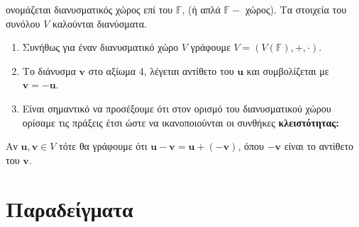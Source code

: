 \documentclass[a4paper,table]{report}
\begin{document}
\begin{dfn}
\vspace{\baselineskip}

ονομάζεται \textcolor{Col1}{διανυσματικός χώρος} επί του $\mathbb{F}$, 
(ή απλά $ \mathbb{F}-$ χώρος).  Τα 
στοιχεία του συνόλου $V$ καλούνται \textcolor{Col1}{διανύσματα}.
\end{dfn}

\begin{rem}
\item {}
  \begin{enumerate}
    \item Συνήθως για έναν διανυσματικό χώρο $V$ γράφουμε 
      $V = (V(\mathbb{F}), +, \cdot) $.
    \item Το διάνυσμα $ \mathbf{v} $ στο αξίωμα 4, λέγεται 
      \textcolor{Col1}{αντίθετο} του $ \mathbf{u} $ και συμβολίζεται με 
      $ \mathbf{v} = - \mathbf{u} $.
    \item Είναι σημαντικό να προσέξουμε ότι στον ορισμό του διανυσματικού χώρου 
      ορίσαμε τις πράξεις έτσι ώστε να ικανοποιούνται οι συνθήκες \textbf{κλειστότητας:}
  \end{enumerate}
\end{rem}

\begin{rem}
  Αν $ \mathbf{u}, \mathbf{v} \in V $ τότε θα γράφουμε ότι 
  $ \mathbf{u} - \mathbf{v} = \mathbf{u} + (- \mathbf{v}) $, 
  όπου $ - \mathbf{v} $ είναι το \textcolor{Col2}{αντίθετο} του $ \mathbf{v} $.
\end{rem}


\section{Παραδείγματα}
\end{document}

